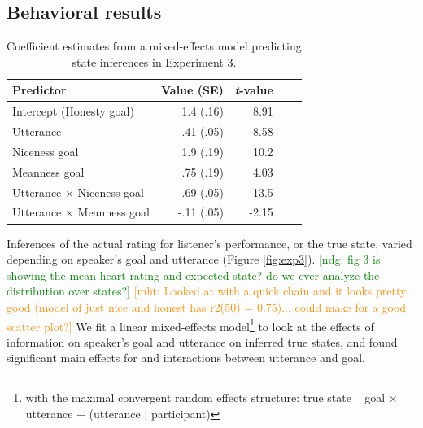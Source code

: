 \documentclass[10pt,letterpaper]{article}
\newcommand{\ndg}[1]{\textcolor{Green}{[ndg: #1]}}
\newcommand{\mht}[1]{\textcolor{DarkOrange}{[mht: #1]}}
\begin{document}
\subsection{Behavioral results}


\begin{table}[t]
\caption{\label{tab:lmer2}  Coefficient estimates from a mixed-effects model predicting state inferences in Experiment 3.} 
\begin{center} 
\begin{tabular}{l r r r l} 
\hline
Predictor  &  Value (SE) & \emph{t}-value\\
\hline
Intercept (Honesty goal)  & 1.4 (.16) & 8.91 \\
Utterance & .41 (.05) &  8.58 \\
Niceness goal  & 1.9 (.19) & 10.2 \\
Meanness goal & .75 (.19) & 4.03 \\
Utterance $\times$ Niceness goal & -.69 (.05) & -13.5 \\
Utterance $\times$ Meanness goal & -.11 (.05) & -2.15 \\
\hline
\end{tabular} 
\end{center} 
\end{table}

Inferences of the actual rating for listener's performance, or the true state, varied depending on speaker's goal and utterance (Figure \ref{fig:exp3}).
\ndg{fig 3 is showing the mean heart rating and expected state? do we ever analyze the distribution over states?}
\mht{Looked at with a quick chain and it looks pretty good (model of just nice and honest has r2(50) = 0.75)... could make for a good scatter plot?}
We fit a linear mixed-effects model\footnote{with the maximal convergent random effects structure: true state ~ goal $\times$ utterance + (utterance $|$ participant)} to look at the effects of information on speaker's goal and utterance on inferred true states, and found significant main effects for and interactions between utterance and goal. 
\end{document}
